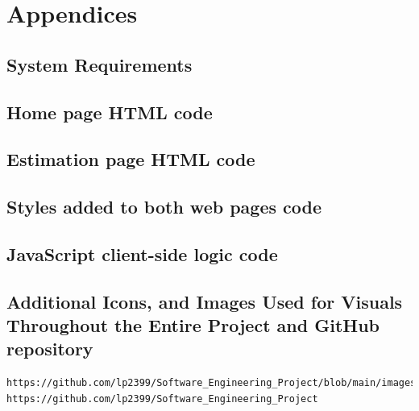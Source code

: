\documentclass[12pt]{article}
\begin{document}



\section{Appendices}
\renewcommand{\thesubsection}{\Alph{subsection}}
\subsection{System Requirements}
\label{subsec:A}

\subsection{Home page HTML code}
\label{subsec:B}
\let\clearpage\relax

\subsection{Estimation page HTML code}
\label{subsec:C}
\let\clearpage\relax

\subsection{Styles added to both web pages code}
\label{subsec:D}
\let\clearpage\relax

\subsection{JavaScript client-side logic code}
\label{subsec:E}
\let\clearpage\relax

\subsection{Additional Icons, and Images Used for Visuals Throughout the Entire Project and GitHub repository}
\label{subsec:F}
\begin{lstlisting}[breaklines]
https://github.com/lp2399/Software_Engineering_Project/blob/main/images_sources.txt
https://github.com/lp2399/Software_Engineering_Project
\end{lstlisting}

\newpage
\end{document}
